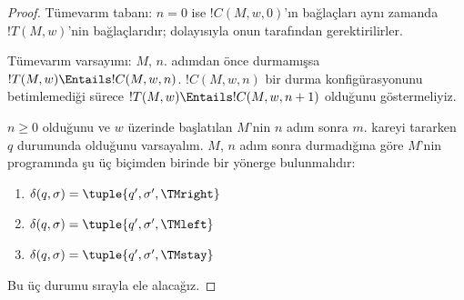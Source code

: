 \documentclass[../../../include/open-logic-section]{subfiles}
\begin{document}
\begin{proof}
Tümevarım tabanı: $n=0$ ise $!C(M,w,0)$'ın bağlaçları aynı zamanda
$!T(M,w)$'nin bağlaçlarıdır; dolayısıyla onun tarafından gerektirilirler.

Tümevarım varsayımı: $M$, $n$. adımdan önce durmamışsa
$!T(M,w)\Entails !C(M,w,n)$. $!C(M,w,n)$ bir durma konfigürasyonunu
betimlemediği sürece $!T(M,w)\Entails !C(M,w,n+1)$ olduğunu göstermeliyiz.

$n\ge 0$ olduğunu ve $w$ üzerinde başlatılan $M$'nin $n$ adım sonra $m$.
kareyi tararken $q$ durumunda olduğunu varsayalım. $M$, $n$ adım sonra
durmadığına göre $M$'nin programında şu üç biçimden birinde bir yönerge
bulunmalıdır:

\begin{enumerate} 
\item {} $\delta(q, \sigma) = \tuple{q', \sigma', \TMright}$

\item {} $\delta(q, \sigma) = \tuple{q', \sigma', \TMleft}$

\item {} $\delta(q, \sigma) = \tuple{q', \sigma', \TMstay}$
\end{enumerate}

Bu üç durumu sırayla ele alacağız.


\end{proof}
\end{document}
